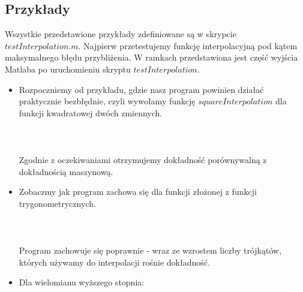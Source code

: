 \documentclass{article}
\begin{document}
\subsection{Przykłady}
Wszystkie przedstawione przykłady zdefiniowane są w skrypcie $testInterpolation.m$. Najpierw przetestujemy funkcję interpolacyjną pod kątem maksymalnego błędu przybliżenia. W ramkach przedstawiona jest część wyjścia Matlaba po uruchomieniu skryptu $testInterpolation$.\\
\begin{itemize}
\item
Rozpoczniemy od przykładu, gdzie nasz program powinien działać praktycznie bezbłędnie, czyli wywołamy funkcję $squareInterpolation$ dla funkcji kwadratowej dwóch zmiennych.\\\\
\noindent{}\\\\
Zgodnie z oczekiwaniami otrzymujemy dokładność porównywalną z dokładnością maszynową.
\item
Zobaczmy jak program zachowa się dla funkcji złożonej z funkcji trygonometrycznych.\\\\
\noindent{}\\\\
Program zachowuje się poprawnie - wraz ze wzrostem liczby trójkątów, których używamy do interpolacji rośnie dokładność.
\item
Dla wielomianu wyższego stopnia:\\\\
\noindent{}
\end{itemize}
\end{document}
